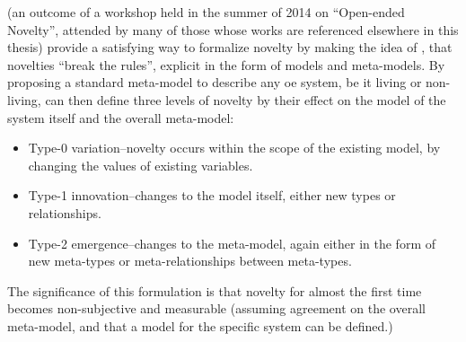 \Textcite{BanzhafBaumgaertnerBeslonEtAl2016} (an outcome of a workshop held in the summer of 2014 on ``Open-ended Novelty'', attended by many of those whose works are referenced elsewhere in this thesis) provide a satisfying way to formalize novelty by making the idea of \textcite{Boden2004}, that novelties ``break the rules'', explicit in the form of models and meta-models. By proposing a standard meta-model to describe any \gls{oe} system, be it living or non-living, \textcite{BanzhafBaumgaertnerBeslonEtAl2016} can then define three levels of novelty by their effect on the model of the system itself and the overall meta-model:

\begin{itemize}
	\item Type-0 variation--novelty occurs within the scope of the existing model, by changing the values of existing variables.
	\item Type-1 innovation--changes to the model itself, either new types or relationships.
	\item Type-2 emergence--changes to the meta-model, again either in the form of new meta-types or meta-relationships between meta-types.
\end{itemize}
	
The significance of this formulation is that novelty for almost the first time becomes non-subjective and measurable (assuming agreement on the overall meta-model, and that a model for the specific system can be defined.)

